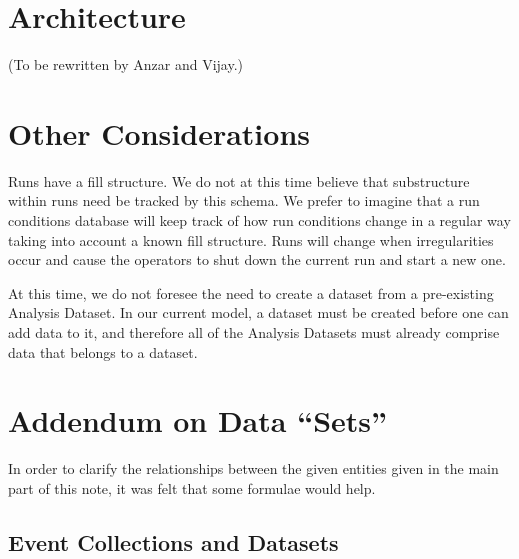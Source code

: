 \documentclass{cmspaper}
\begin{document}
\section{Architecture}

(To be rewritten by Anzar and Vijay.)


\section{Other Considerations}

Runs have a fill structure.  We do not at this time believe that
substructure within runs need be tracked by this schema.  We prefer
to imagine that a run conditions database will keep track of how run
conditions change in a regular way taking into account a known fill
structure.  Runs will change when irregularities occur and cause the
operators to shut down the current run and start a new one.

At this time, we do not foresee the need to create a dataset from a
pre-existing Analysis Dataset.  In our current model, a dataset must be
created before one can add data to it, and therefore all of the Analysis
Datasets must already comprise data that belongs to a dataset.


\appendix

\section{Addendum on Data ``Sets''}\label{appendix}

In order to clarify the relationships between the given entities given
in the main part of this note, it was felt that some formulae would help.

\subsection{Event Collections and Datasets}
\end{document}
